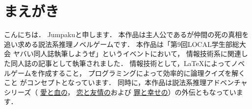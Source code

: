 \section*{まえがき}
こんにちは．
Jumpakuと申します．
本作品は主人公であるが仲間の死の真相を追い求める説法系推理ノベルゲームです．
本作品は「第9回LOCAL学生部総大会 ヤバい同人誌執筆しようぜ」というイベントにおいて，
情報技術系に関連した同人誌の記事として執筆されました．
情報技術として，\LaTeX によってノベルゲームを作成すること，
プログラミングによって効率的に論理クイズを解くこと
がコンセプトとなっています．
同時に，本作品は説法系推理アドベンチャシリーズ（
\href{http://jumpaku.hatenablog.com/entry/2016/04/14/002437}{\underline{愛と血の}}，
\href{http://jumpaku.hatenablog.com/entry/2016/07/24/032632}{\underline{恋と友情の}}および
\href{http://jumpaku.hatenablog.com/entry/2017/07/24/044918}{\underline{罪と幸せの}}）の外伝ともなっています．

